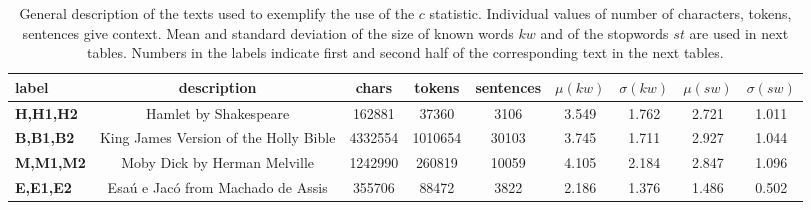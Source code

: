\begin{table*}[h!]
\begin{center}
\begin{tabular}{| l || c | c | c | c | c | c | c | c |}\hline
label & description & chars & tokens & sentences & $\mu(kw)$ & $\sigma(kw)$ & $\mu(sw)$ & $\sigma(sw)$ \\\hline\hline
{\bf {\bf H,H1,H2}} & Hamlet by Shakespeare & 162881 & 37360 & 3106 & 3.549 & 1.762 & 2.721 & 1.011 \\\hline
{\bf {\bf B,B1,B2}} & King James Version of the Holly Bible & 4332554 & 1010654 & 30103 & 3.745 & 1.711 & 2.927 & 1.044 \\\hline
{\bf {\bf M,M1,M2}} & Moby Dick by Herman Melville & 1242990 & 260819 & 10059 & 4.105 & 2.184 & 2.847 & 1.096 \\\hline
{\bf {\bf E,E1,E2}} & Esa\'u e Jac\'o from Machado de Assis & 355706 & 88472 & 3822 & 2.186 & 1.376 & 1.486 & 0.502 \\\hline
\end{tabular}
\caption{General description of the texts used to exemplify the use of the $c$ statistic.
Individual values of number of characters, tokens, sentences give context.
Mean and standard deviation of the size of known words $kw$ and of the stopwords
$st$ are used in next tables.
Numbers in the labels indicate first and second half of the corresponding text in the next tables.}
\end{center}
\end{table*}